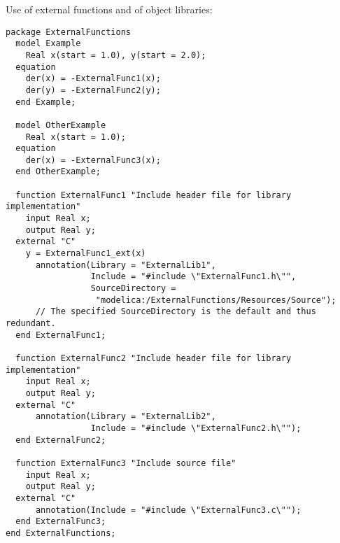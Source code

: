 \begin{example}
Use of external functions and of object libraries:
\begin{lstlisting}[language=modelica]
package ExternalFunctions
  model Example
    Real x(start = 1.0), y(start = 2.0);
  equation
    der(x) = -ExternalFunc1(x);
    der(y) = -ExternalFunc2(y);
  end Example;

  model OtherExample
    Real x(start = 1.0);
  equation
    der(x) = -ExternalFunc3(x);
  end OtherExample;

  function ExternalFunc1 "Include header file for library implementation"
    input Real x;
    output Real y;
  external "C"
    y = ExternalFunc1_ext(x)
      annotation(Library = "ExternalLib1",
                 Include = "#include \"ExternalFunc1.h\"",
                 SourceDirectory =
                  "modelica:/ExternalFunctions/Resources/Source");
      // The specified SourceDirectory is the default and thus redundant.
  end ExternalFunc1;

  function ExternalFunc2 "Include header file for library implementation"
    input Real x;
    output Real y;
  external "C"
      annotation(Library = "ExternalLib2",
                 Include = "#include \"ExternalFunc2.h\"");
  end ExternalFunc2;

  function ExternalFunc3 "Include source file"
    input Real x;
    output Real y;
  external "C"
      annotation(Include = "#include \"ExternalFunc3.c\"");
  end ExternalFunc3;
end ExternalFunctions;


\end{lstlisting}
\end{example}
